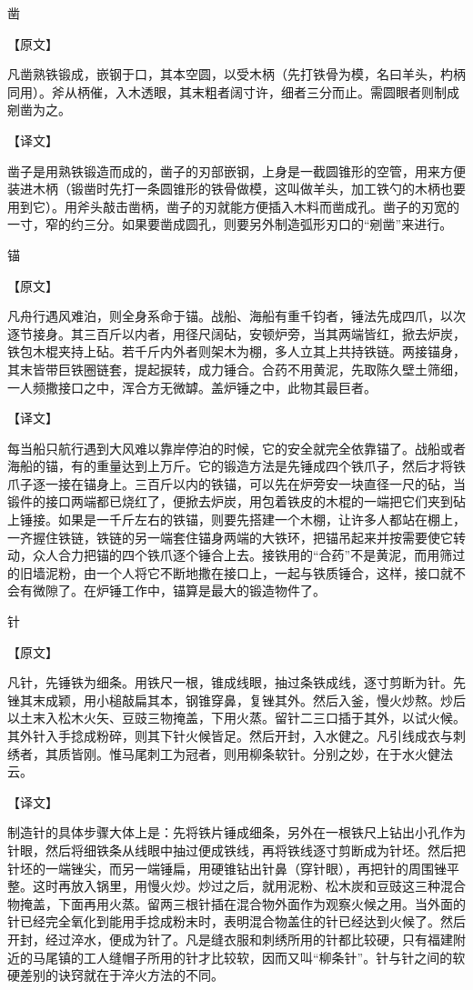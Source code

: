 \documentclass[12pt,UTF8]{ctexbook}
\begin{document}
凿

【原文】

凡凿熟铁锻成，嵌钢于口，其本空圆，以受木柄（先打铁骨为模，名曰羊头，杓柄同用）。斧从柄催，入木透眼，其末粗者阔寸许，细者三分而止。需圆眼者则制成剜凿为之。

【译文】

凿子是用熟铁锻造而成的，凿子的刃部嵌钢，上身是一截圆锥形的空管，用来方便装进木柄（锻凿时先打一条圆锥形的铁骨做模，这叫做羊头，加工铁勺的木柄也要用到它）。用斧头敲击凿柄，凿子的刃就能方便插入木料而凿成孔。凿子的刃宽的一寸，窄的约三分。如果要凿成圆孔，则要另外制造弧形刃口的“剜凿”来进行。

锚

【原文】

凡舟行遇风难泊，则全身系命于锚。战船、海船有重千钧者，锤法先成四爪，以次逐节接身。其三百斤以内者，用径尺阔砧，安顿炉旁，当其两端皆红，掀去炉炭，铁包木棍夹持上砧。若千斤内外者则架木为棚，多人立其上共持铁链。两接锚身，其末皆带巨铁圈链套，提起捩转，成力锤合。合药不用黄泥，先取陈久壁土筛细，一人频撒接口之中，浑合方无微罅。盖炉锤之中，此物其最巨者。

【译文】

每当船只航行遇到大风难以靠岸停泊的时候，它的安全就完全依靠锚了。战船或者海船的锚，有的重量达到上万斤。它的锻造方法是先锤成四个铁爪子，然后才将铁爪子逐一接在锚身上。三百斤以内的铁锚，可以先在炉旁安一块直径一尺的砧，当锻件的接口两端都已烧红了，便掀去炉炭，用包着铁皮的木棍的一端把它们夹到砧上锤接。如果是一千斤左右的铁锚，则要先搭建一个木棚，让许多人都站在棚上，一齐握住铁链，铁链的另一端套住锚身两端的大铁环，把锚吊起来并按需要使它转动，众人合力把锚的四个铁爪逐个锤合上去。接铁用的“合药”不是黄泥，而用筛过的旧墙泥粉，由一个人将它不断地撒在接口上，一起与铁质锤合，这样，接口就不会有微隙了。在炉锤工作中，锚算是最大的锻造物件了。

针

【原文】

凡针，先锤铁为细条。用铁尺一根，锥成线眼，抽过条铁成线，逐寸剪断为针。先锉其末成颖，用小槌敲扁其本，钢锥穿鼻，复锉其外。然后入釜，慢火炒熬。炒后以土末入松木火矢、豆豉三物掩盖，下用火蒸。留针二三口插于其外，以试火候。其外针入手捻成粉碎，则其下针火候皆足。然后开封，入水健之。凡引线成衣与刺绣者，其质皆刚。惟马尾刺工为冠者，则用柳条软针。分别之妙，在于水火健法云。

【译文】

制造针的具体步骤大体上是：先将铁片锤成细条，另外在一根铁尺上钻出小孔作为针眼，然后将细铁条从线眼中抽过便成铁线，再将铁线逐寸剪断成为针坯。然后把针坯的一端锉尖，而另一端锤扁，用硬锥钻出针鼻（穿针眼），再把针的周围锉平整。这时再放入锅里，用慢火炒。炒过之后，就用泥粉、松木炭和豆豉这三种混合物掩盖，下面再用火蒸。留两三根针插在混合物外面作为观察火候之用。当外面的针已经完全氧化到能用手捻成粉末时，表明混合物盖住的针已经达到火候了。然后开封，经过淬水，便成为针了。凡是缝衣服和刺绣所用的针都比较硬，只有福建附近的马尾镇的工人缝帽子所用的针才比较软，因而又叫“柳条针”。针与针之间的软硬差别的诀窍就在于淬火方法的不同。
\end{document}
